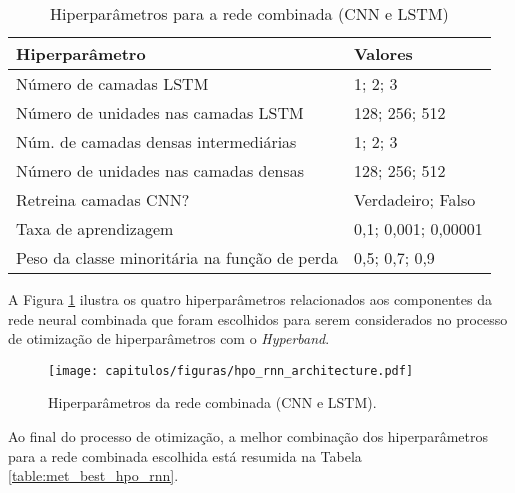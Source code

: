 \begin{table}[]
\centering
\caption{Hiperparâmetros para a rede combinada (CNN e LSTM)}
\label{table:met_hiperparam_rnn}
\begin{tabular}{@{}ll@{}}
\toprule
Hiperparâmetro                        & Valores             \\ \midrule
Número de camadas LSTM                & 1; 2; 3             \\
Número de unidades nas camadas LSTM   & 128; 256; 512       \\
Núm. de camadas densas intermediárias & 1; 2; 3             \\
Número de unidades nas camadas densas & 128; 256; 512       \\
Retreina camadas CNN?                 & Verdadeiro; Falso   \\
Taxa de aprendizagem                  & 0,1; 0,001; 0,00001 \\
Peso da classe minoritária na função de perda   & 0,5; 0,7; 0,9       \\ \bottomrule
\end{tabular}
\end{table}

A Figura \ref{fig:hpo_rnn_architecture} ilustra os quatro hiperparâmetros relacionados aos componentes da rede neural combinada que foram escolhidos para serem considerados no processo de otimização de hiperparâmetros com o \textit{Hyperband}.

\begin{figure}[!ht]
\centering
\texttt{[image: capitulos/figuras/hpo\_rnn\_architecture.pdf]}
\caption{Hiperparâmetros da rede combinada (CNN e LSTM).}
\label{fig:hpo_rnn_architecture}
\end{figure}

Ao final do processo de otimização, a melhor combinação dos hiperparâmetros para a rede combinada escolhida está resumida na Tabela \ref{table:met_best_hpo_rnn}.


